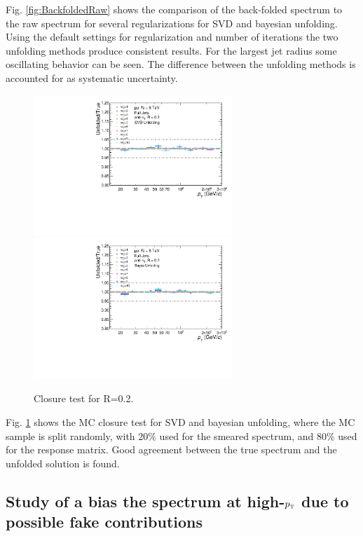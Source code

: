 \documentclass[ALICE]{ALICE_analysis_notes}
\newcommand{\pT}{$p_{\mbox{\tiny T}}$\xspace}
\begin{document}
Fig. \ref{fig:BackfoldedRaw} shows the comparison of the back-folded spectrum to the raw spectrum for several regularizations for SVD and bayesian unfolding. Using the default settings for regularization and number of iterations the two unfolding methods produce consistent results. For the largest jet radius some oscillating behavior can be seen. The difference between the unfolding methods is accounted for as systematic uncertainty.

\begin{figure}
    \centering
    \begin{multicols}{2}
            \includegraphics[width=7.5cm]{figures/UnfoldingComparisons/Closure/RatioClosure1DSvd_R02.pdf}
        \vfill\null
        \columnbreak
            \includegraphics[width=7.5cm]{figures/UnfoldingComparisons/Closure/RatioClosure1DBayes_R02.pdf}
        \vfill\null
    \end{multicols}
    \caption{Closure test for R=0.2.}
    \label{fig:Closure}
\end{figure}

Fig. \ref{fig:Closure} shows the MC closure test for SVD and bayesian unfolding, where the MC sample is split randomly, with 20$\%$ used for the smeared spectrum, and 80$\%$ used for the response matrix. Good agreement between the true spectrum and the unfolded solution is found.

\subsection{Study of a bias the spectrum at high-\texorpdfstring{\pT}{pT} due to possible fake contributions}
\label{sec:biasStudy}
\end{document}
